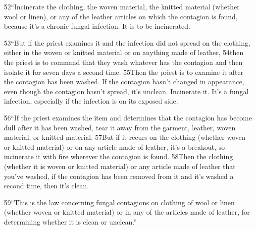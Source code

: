 \v{52}``Incinerate the clothing, the woven material, the knitted material (whether wool or linen), or any of the leather articles on which the contagion is found, because it's a chronic fungal infection. It is to be incinerated.

\v{53}``But if the priest examines it and the infection did not spread on the clothing, either in the woven or knitted material or on anything made of leather, \v{54}then the priest is to command that they wash whatever has the contagion and then isolate it for seven days a second time. \v{55}Then the priest is to examine it after the contagion has been washed. If the contagion hasn't changed in appearance, even though the contagion hasn't spread, it's unclean. Incinerate it. It's a fungal infection, especially if the infection is on its exposed side.

\v{56}``If the priest examines the item and determines that the contagion has become dull after it has been washed, tear it away from the garment, leather, woven material, or knitted material. \v{57}But if it recurs on the clothing (whether woven or knitted material) or on any article made of leather, it's a breakout, so incinerate it with fire wherever the contagion is found. \v{58}Then the clothing (whether it is woven or knitted material) or any article made of leather that you've washed, if the contagion has been removed from it and it's washed a second time, then it's clean.

\v{59}``This is the law concerning fungal contagions on clothing of wool or linen (whether woven or knitted material) or in any of the articles made of leather, for determining whether it is clean or unclean.''

